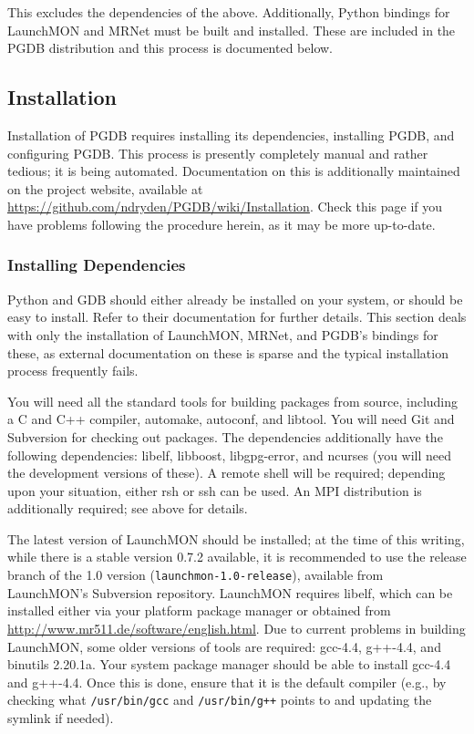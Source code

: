 \documentclass{refart}
\begin{document}
This excludes the dependencies of the above. Additionally, Python bindings for LaunchMON and MRNet must be built and installed. These are included in the PGDB distribution and this process is documented below.

\subsection{Installation}

Installation of PGDB requires installing its dependencies, installing PGDB, and configuring PGDB. This process is presently completely manual and rather tedious; it is being automated. Documentation on this is additionally maintained on the project website, available at \url{https://github.com/ndryden/PGDB/wiki/Installation}. Check this page if you have problems following the procedure herein, as it may be more up-to-date.

\subsubsection{Installing Dependencies}

Python and GDB should either already be installed on your system, or should be easy to install. Refer to their documentation for further details. This section deals with only the installation of LaunchMON, MRNet, and PGDB's bindings for these, as external documentation on these is sparse and the typical installation process frequently fails.

You will need all the standard tools for building packages from source, including a C and C++ compiler, automake, autoconf, and libtool. You will need Git and Subversion for checking out packages. The dependencies additionally have the following dependencies: libelf, libboost, libgpg-error, and ncurses (you will need the development versions of these). A remote shell will be required; depending upon your situation, either rsh or ssh can be used. An MPI distribution is additionally required; see above for details.

The latest version of LaunchMON should be installed; at the time of this writing, while there is a stable version 0.7.2 available, it is recommended to use the release branch of the 1.0 version (\texttt{launchmon-1.0-release}), available from LaunchMON's Subversion repository. LaunchMON requires libelf, which can be installed either via your platform package manager or obtained from \url{http://www.mr511.de/software/english.html}. Due to current problems in building LaunchMON, some older versions of tools are required: gcc-4.4, g++-4.4, and binutils 2.20.1a. Your system package manager should be able to install gcc-4.4 and g++-4.4. Once this is done, ensure that it is the default compiler (e.g., by checking what \texttt{/usr/bin/gcc} and \texttt{/usr/bin/g++} points to and updating the symlink if needed).
\end{document}
